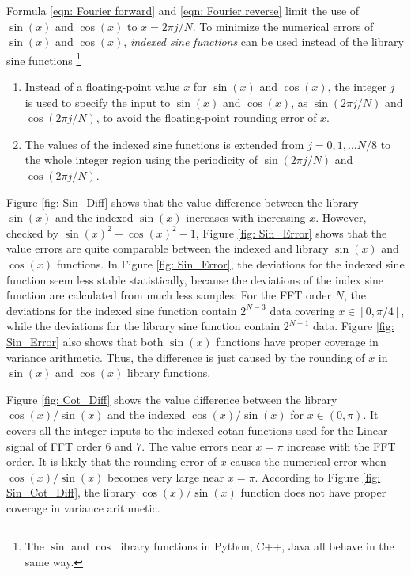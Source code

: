 \documentclass[twoside]{article}
\numberwithin{equation}{section}
\begin{document}
Formula \eqref{eqn: Fourier forward} and \eqref{eqn: Fourier reverse} limit the use of $\sin(x)$ and $\cos(x)$ to $x = 2\pi j/N$.
To minimize the numerical errors of $\sin(x)$ and $\cos(x)$, \emph{indexed sine functions} can be used instead of the library sine functions \footnote{The $\sin$ and $\cos$ library functions in Python, C++, Java all behave in the same way.}
\begin{enumerate}
\item Instead of a floating-point value $x$ for $\sin(x)$ and $\cos(x)$, the integer $j$ is used to specify the input to $\sin(x)$ and $\cos(x)$, as $\sin(2\pi j/N)$ and $\cos(2\pi j/N)$, to avoid the floating-point rounding error of $x$.

\item The values of the indexed sine functions is extended from $j = 0,1,\dots N/8$ to the whole integer region using the periodicity of $\sin(2\pi j/N)$ and $\cos(2\pi j/N)$.

\end{enumerate}

Figure \ref{fig: Sin_Diff} shows that the value difference between the library $\sin(x)$ and the indexed $\sin(x)$ increases with increasing $x$.
However, checked by $\sin(x)^2 + \cos(x)^2 - 1$, Figure \ref{fig: Sin_Error} shows that the value errors are quite comparable between  the indexed and library $\sin(x)$ and $\cos(x)$ functions.
In Figure \ref{fig: Sin_Error}, the deviations for the indexed sine function seem less stable statistically, because the deviations of the index sine function are calculated from much less samples: For the FFT order $N$, the deviations for the indexed sine function contain $2^{N-3}$ data covering $x \in [0, \pi/4]$, while the deviations for the library sine function contain $2^{N+1}$ data.
Figure \ref{fig: Sin_Error} also shows that both $\sin(x)$ functions have proper coverage in variance arithmetic.
Thus, the difference is just caused by the rounding of $x$ in $\sin(x)$ and $\cos(x)$ library functions.

Figure \ref{fig: Cot_Diff} shows the value difference between the library $\cos(x)/\sin(x)$ and the indexed $\cos(x)/\sin(x)$ for $x \in (0, \pi)$.
It covers all the integer inputs to the indexed cotan functions used for the Linear signal of FFT order $6$ and $7$.
The value errors near $x = \pi$ increase with the FFT order.
It is likely that the rounding error of $x$ causes the numerical error when $\cos(x)/\sin(x)$ becomes very large near $x = \pi$.
According to Figure \ref{fig: Sin_Cot_Diff}, the library $\cos(x)/\sin(x)$ function does not have proper coverage in variance arithmetic.
\end{document}
